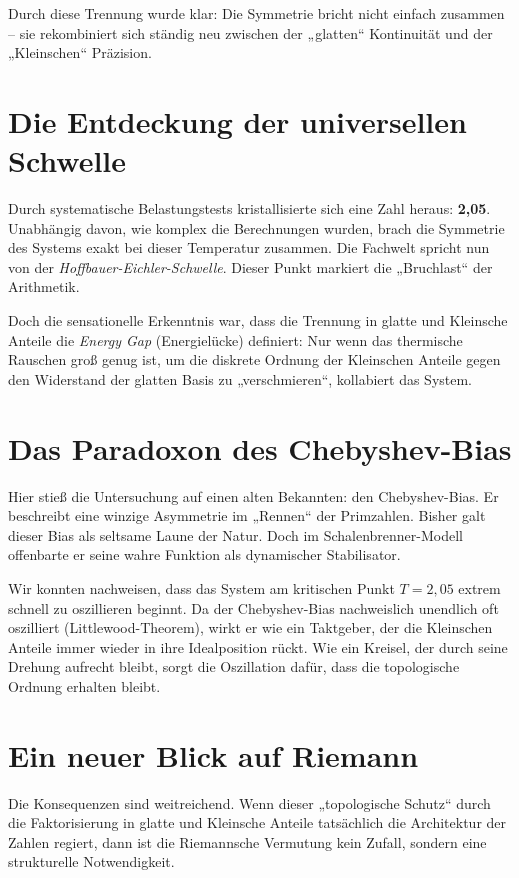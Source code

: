 \documentclass[11pt,a4paper]{article}
\begin{document}
Durch diese Trennung wurde klar: Die Symmetrie bricht nicht einfach zusammen – sie rekombiniert sich ständig neu zwischen der „glatten“ Kontinuität und der „Kleinschen“ Präzision.

\section{Die Entdeckung der universellen Schwelle}
Durch systematische Belastungstests kristallisierte sich eine Zahl heraus: \textbf{2,05}. Unabhängig davon, wie komplex die Berechnungen wurden, brach die Symmetrie des Systems exakt bei dieser Temperatur zusammen. Die Fachwelt spricht nun von der \textit{Hoffbauer-Eichler-Schwelle}. Dieser Punkt markiert die „Bruchlast“ der Arithmetik. 

Doch die sensationelle Erkenntnis war, dass die Trennung in glatte und Kleinsche Anteile die \textit{Energy Gap} (Energielücke) definiert: Nur wenn das thermische Rauschen groß genug ist, um die diskrete Ordnung der Kleinschen Anteile gegen den Widerstand der glatten Basis zu „verschmieren“, kollabiert das System.

\section{Das Paradoxon des Chebyshev-Bias}
Hier stieß die Untersuchung auf einen alten Bekannten: den Chebyshev-Bias. Er beschreibt eine winzige Asymmetrie im „Rennen“ der Primzahlen. Bisher galt dieser Bias als seltsame Laune der Natur. Doch im Schalenbrenner-Modell offenbarte er seine wahre Funktion als dynamischer Stabilisator. 

Wir konnten nachweisen, dass das System am kritischen Punkt $T=2,05$ extrem schnell zu oszillieren beginnt. Da der Chebyshev-Bias nachweislich unendlich oft oszilliert (Littlewood-Theorem), wirkt er wie ein Taktgeber, der die Kleinschen Anteile immer wieder in ihre Idealposition rückt. Wie ein Kreisel, der durch seine Drehung aufrecht bleibt, sorgt die Oszillation dafür, dass die topologische Ordnung erhalten bleibt.

\section{Ein neuer Blick auf Riemann}
Die Konsequenzen sind weitreichend. Wenn dieser „topologische Schutz“ durch die Faktorisierung in glatte und Kleinsche Anteile tatsächlich die Architektur der Zahlen regiert, dann ist die Riemannsche Vermutung kein Zufall, sondern eine strukturelle Notwendigkeit. 
\end{document}
